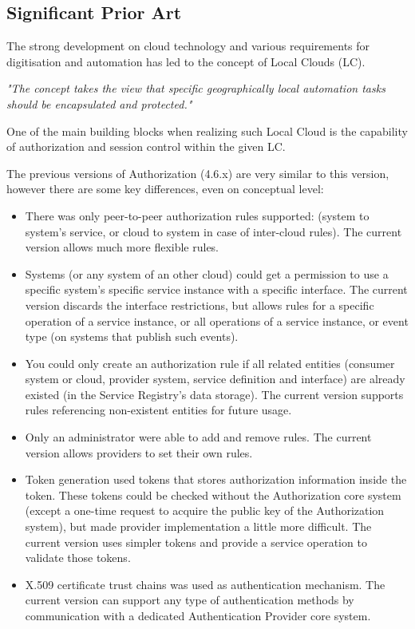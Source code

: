 \documentclass[a4paper]{arrowhead}
\begin{document}
\subsection{Significant Prior Art}
\label{sec:prior_art}

The strong development on cloud technology and various requirements for digitisation and automation has led to the concept of Local Clouds (LC).

\textit{"The concept takes the view that specific geographically local automation tasks should be encapsulated and protected."} \cite{jerker2017localclouds}

One of the main building blocks when realizing such Local Cloud is the capability of authorization and session control within the given LC.

The previous versions of Authorization (4.6.x) are very similar to this version, however there are some key differences, even on conceptual level:

\begin{itemize}
    \item There was only peer-to-peer authorization rules supported: (system to system's service, or cloud to system in case of inter-cloud rules). The current version allows much more flexible rules.
    \item Systems (or any system of an other cloud) could get a permission to use a specific system's specific service instance with a specific interface. The current version discards the interface restrictions, but allows rules for a specific operation of a service instance, or all operations of a service instance, or event type (on systems that publish such events). 
    \item You could only create an authorization rule if all related entities (consumer system or cloud, provider system, service definition and interface) are already existed (in the Service Registry's data storage). The current version supports rules referencing non-existent entities for future usage.
    \item Only an administrator were able to add and remove rules. The current version allows providers to set their own rules.
    \item Token generation used tokens that stores authorization information inside the token. These tokens could be checked without the Authorization core system (except a one-time request to acquire the public key of the Authorization system), but made provider implementation a little more difficult. The current version uses simpler tokens and provide a service operation to validate those tokens. 
    \item X.509 certificate trust chains was used as authentication mechanism. The current version can support any type of authentication methods by communication with a dedicated Authentication Provider core system.
\end{itemize}
\end{document}
